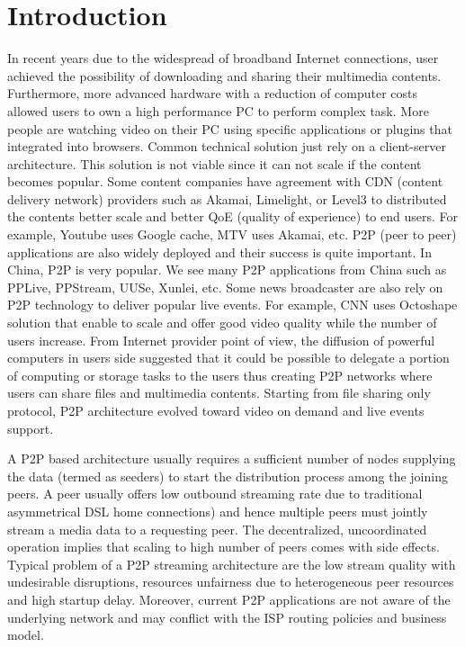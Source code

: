 \documentclass[paper]{ieice}
\begin{document}
\section{Introduction}\label{intro}
In recent years due to the widespread of broadband Internet connections, user achieved the possibility of downloading and sharing their multimedia contents.
Furthermore, more advanced hardware with a reduction of computer costs allowed users to own a high performance PC to perform complex task.
More people are watching video on their PC using specific applications or plugins that integrated into browsers.
Common technical solution just rely on a client-server architecture.
This solution is not viable since it can not scale if the content becomes popular.
Some content companies have agreement with CDN (content delivery network) providers such as Akamai, Limelight, or Level3 to distributed the contents better scale and better QoE (quality of experience) to end users.
For example, Youtube uses Google cache, MTV uses Akamai, etc. P2P (peer to peer) applications are also widely deployed and their success is quite important. 
In China, P2P is very popular. 
We see many P2P applications from China such as PPLive, PPStream, UUSe, Xunlei, etc.  
Some news broadcaster are also rely on P2P technology to deliver popular live events.
For example, CNN uses Octoshape solution that enable to scale and offer good video quality while the number of users increase.
From Internet provider point of view, the diffusion of powerful computers in users side suggested that it could be possible to delegate a portion of computing or storage tasks to the users thus creating P2P networks where users can share files and multimedia contents.
Starting from file sharing only protocol, P2P architecture evolved toward video on demand and live events support. 

A P2P based architecture usually requires a sufficient number of nodes supplying the data (termed as seeders) to start the distribution process among the joining peers.
A peer usually offers low outbound streaming rate due to traditional asymmetrical DSL home connections) and hence multiple peers must jointly stream a media data to a requesting peer. 
The decentralized, uncoordinated operation implies that scaling to high number of peers comes with side effects.
Typical problem of a P2P streaming architecture are the low stream quality with undesirable disruptions, resources unfairness due to heterogeneous peer resources and high startup delay.
Moreover, current P2P applications are not aware of the underlying network and may conflict with the ISP routing policies and business model.
\end{document}
